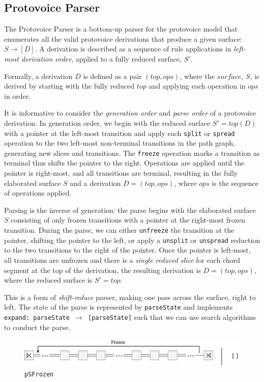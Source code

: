 \documentclass[12pt,a4paper,twoside,openright]{report}
\theoremstyle{definition}
\begin{document}
\subsection{Protovoice Parser}

The Protovoice Parser is a bottom-up parser for the protovoice model that enumerates all the valid protovoice derivations that produce a given surface: $S \to [D]$.
A derivation is described as a sequence of rule applications in \textit{left-most derivation order}, applied to a fully reduced surface, $S'$.

Formally, a derivation $D$ is defined as a pair $(top, ops)$, where the $surface$, $S$, is derived by starting with the fully reduced $top$ and applying each operation in $ops$ in order.

It is informative to consider the \textit{generation order} and \textit{parse order} of a protovoice derivation. 
In generation order, we begin with the reduced surface $S' = top(D)$ with a pointer at the left-most transition and apply each \texttt{split} or \texttt{spread} operation to the two left-most non-terminal transitions in the path graph, generating new slices and transitions.
The \texttt{freeze} operation marks a transition as terminal thus shifts the pointer to the right.
Operations are applied until the pointer is right-most, and all transitions are terminal, resulting in the fully elaborated surface $S$ and a derivation $D=(top, ops)$, where $ops$ is the sequence of operations applied.

Parsing is the inverse of generation: the parse begins with the elaborated surface $S$ consisting of only frozen transitions with a pointer at the right-most frozen transition.
During the parse, we can either \texttt{unfreeze} the transition at the pointer, shifting the pointer to the left, or apply a \texttt{unsplit} or \texttt{unspread} reduction to the two transitions to the right of the pointer.
Once the pointer is left-most, all transitions are unfrozen and there is a \textit{single reduced slice} for each chord segment at the top of the derivation, the resulting derivation is $D = (top, ops)$, where the reduced surface is $S'=top$.

This is a form of \textit{shift-reduce} parser, making one pass across the surface, right to left. The state of the parse is represented by \texttt{parseState} and implements \texttt{expand: parseState $\to$ [parseState]} such that we can use search algorithms to conduct the parse.

\begin{figure}[h]
  \centering\includegraphics[width=\textwidth]{impl/parseState/frozen.png}
  \caption{\texttt{pSFrozen}}
  \label{fig:pSFrozen}
\end{figure}
\end{document}
